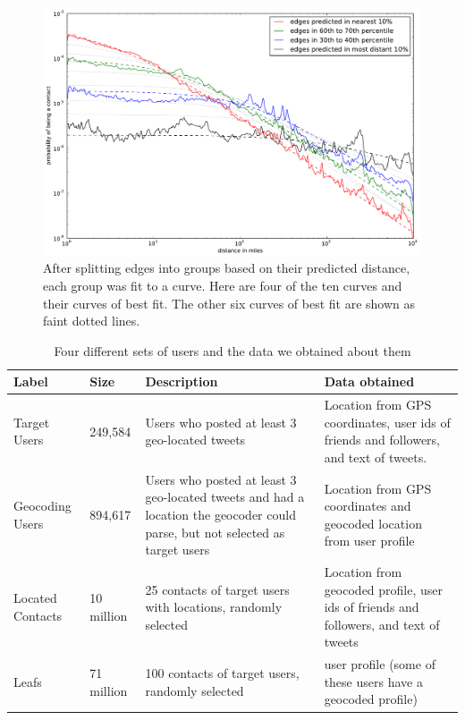 \documentclass[letterpaper]{article}
\begin{document}
\begin{figure}[tb]
\centering
\includegraphics[width=.9\linewidth]{figures/vect_fit.pdf}
\caption{
After splitting edges into groups based on their predicted distance, each group
was fit to a curve. Here are four of the ten curves and their curves of best
fit. The other six curves of best fit are shown as faint dotted lines.}
\label{fig:NearProbFit}
\end{figure}



\begin{table}[tb]
\scriptsize
\centering
\begin{tabular}{l l p{4cm} p{6cm}}
    Label & Size & Description & Data obtained \\
    \hline
    Target Users & 249,584 & Users who posted at least 3 geo-located tweets &
    Location from GPS coordinates, user ids of friends and followers,
    and text of tweets. \\
    Geocoding Users & 894,617 & Users who posted at least 3 geo-located tweets
    and had a location the geocoder could parse, but not selected as target users &
    Location from GPS coordinates and geocoded location from user profile \\
    Located Contacts & 10 million & 25 contacts of target users with locations, randomly selected &
    Location from geocoded profile, user ids of friends and followers, and text of tweets \\
    Leafs & 71 million & 100 contacts of target users, randomly selected &
    user profile (some of these users have a geocoded profile)\\
\end{tabular}
\caption{Four different sets of users and the data we obtained about them}
\label{tab:datasets}
\end{table}
\end{document}
